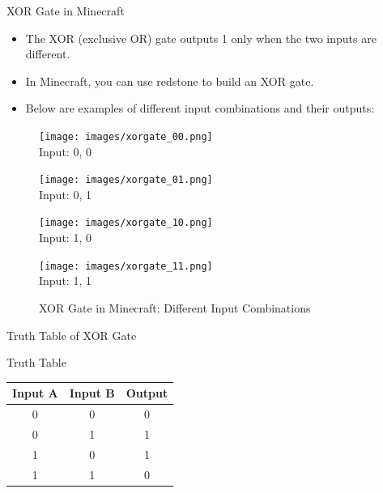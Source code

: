 \documentclass{beamer}
\begin{document}
\begin{frame}{XOR Gate in Minecraft}
    \begin{itemize}
        \item The XOR (exclusive OR) gate outputs 1 only when the two inputs are different.
        \item In Minecraft, you can use redstone to build an XOR gate.
        \item Below are examples of different input combinations and their outputs:
    \end{itemize}
    \begin{figure}[ht]
        \centering
        \begin{minipage}{0.24\textwidth}
            \centering
            \texttt{[image: images/xorgate\_00.png]}\\
            \small Input: 0, 0
        \end{minipage}
        \begin{minipage}{0.24\textwidth}
            \centering
            \texttt{[image: images/xorgate\_01.png]}\\
            \small Input: 0, 1
        \end{minipage}
        \begin{minipage}{0.24\textwidth}
            \centering
            \texttt{[image: images/xorgate\_10.png]}\\
            \small Input: 1, 0
        \end{minipage}
        \begin{minipage}{0.24\textwidth}
            \centering
            \texttt{[image: images/xorgate\_11.png]}\\
            \small Input: 1, 1
        \end{minipage}
        \caption{XOR Gate in Minecraft: Different Input Combinations}
    \end{figure}
\end{frame}

\begin{frame}{Truth Table of XOR Gate}
    \begin{block}{Truth Table}
        \begin{tabular}{|c|c|c|}
            \hline
            Input A & Input B & Output \\
            \hline
            0 & 0 & 0 \\
            0 & 1 & 1 \\
            1 & 0 & 1 \\
            1 & 1 & 0 \\
            \hline
        \end{tabular}
    \end{block}
\end{frame}
\end{document}
